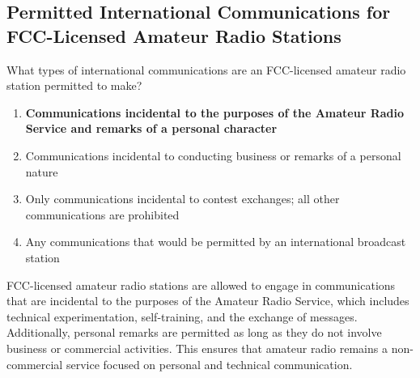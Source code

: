\subsection{Permitted International Communications for FCC-Licensed Amateur Radio Stations}
\label{T1C03}

\begin{tcolorbox}[colback=gray!10!white,colframe=black!75!black,title=T1C03]
What types of international communications are an FCC-licensed amateur radio station permitted to make?
\begin{enumerate}[label=\Alph*,noitemsep]
    \item \textbf{Communications incidental to the purposes of the Amateur Radio Service and remarks of a personal character}
    \item Communications incidental to conducting business or remarks of a personal nature
    \item Only communications incidental to contest exchanges; all other communications are prohibited
    \item Any communications that would be permitted by an international broadcast station
\end{enumerate}
\end{tcolorbox}

FCC-licensed amateur radio stations are allowed to engage in communications that are incidental to the purposes of the Amateur Radio Service, which includes technical experimentation, self-training, and the exchange of messages. Additionally, personal remarks are permitted as long as they do not involve business or commercial activities. This ensures that amateur radio remains a non-commercial service focused on personal and technical communication.